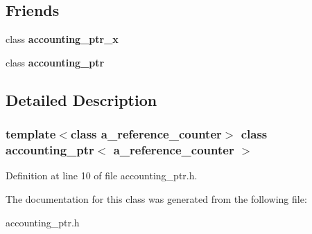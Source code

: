 \subsection*{Friends}
\begin{DoxyCompactItemize}
\item 
class {\bfseries accounting\_\-ptr\_\-x}\label{classaccounting__ptr_ae6054f71b4f41326bddf8e0c16858f2c}

\item 
class {\bf accounting\_\-ptr}\label{classaccounting__ptr_a56b938922fd5f35053a510c4f0bd12fa}

\end{DoxyCompactItemize}


\subsection{Detailed Description}
\subsubsection*{template$<$class a\_\-reference\_\-counter$>$ class accounting\_\-ptr$<$ a\_\-reference\_\-counter $>$}



Definition at line 10 of file accounting\_\-ptr.h.

The documentation for this class was generated from the following file:\begin{DoxyCompactItemize}
\item 
accounting\_\-ptr.h\end{DoxyCompactItemize}
